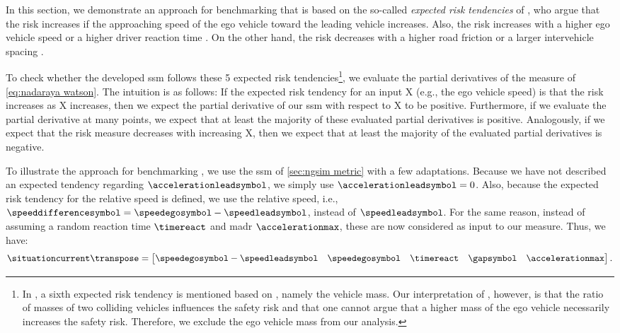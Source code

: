 In this section, we demonstrate an approach for benchmarking  that is based on the so-called \emph{expected risk tendencies} of \textcite{mullakkal2017comparative}, who argue that the risk increases if the approaching speed of the ego vehicle toward the leading vehicle increases.
Also, the risk increases with a higher ego vehicle speed \autocite{aarts2006driving} or a higher driver reaction time \autocite{klauer2006impact}.
On the other hand, the risk decreases with a higher road friction \autocite{wallman2001friction} or a larger intervehicle spacing \autocite{mullakkal2017comparative}.

To check whether the developed \ac{ssm} follows these 5 expected risk tendencies\footnote{In \autocite{mullakkal2017comparative}, a sixth expected risk tendency is mentioned based on \autocite{evans1994driver}, namely the vehicle mass. 
Our interpretation of \autocite{evans1994driver}, however, is that the ratio of masses of two colliding vehicles influences the safety risk and that one cannot argue that a higher mass of the ego vehicle necessarily increases the safety risk. 
Therefore, we exclude the ego vehicle mass from our analysis.}, we evaluate the partial derivatives of the measure of \cref{eq:nadaraya watson}.
The intuition is as follows: If the expected risk tendency for an input X (e.g., the ego vehicle speed) is that the risk increases as X increases, then we expect the partial derivative of our \ac{ssm} with respect to X to be positive.
Furthermore, if we evaluate the partial derivative at many points, we expect that at least the majority of these evaluated partial derivatives is positive.
Analogously, if we expect that the risk measure decreases with increasing X, then we expect that at least the majority of the evaluated partial derivatives is negative.

To illustrate the approach for benchmarking , we use the \ac{ssm} of \cref{sec:ngsim metric} with a few adaptations.
Because we have not described an expected tendency regarding $\accelerationleadsymbol$, we simply use $\accelerationleadsymbol=0$.
\cstarta Also, because the expected risk tendency for the relative speed is defined, we use the relative speed, i.e., $\speeddifferencesymbol=\speedegosymbol-\speedleadsymbol$, instead of $\speedleadsymbol$. 
For the same reason, \cenda instead of assuming a random reaction time $\timereact$ and \ac{madr} $\accelerationmax$, these are now considered as input to our measure. 
Thus, we have:
\begin{equation}
	\label{eq:input partial derivatives}
	\situationcurrent\transpose = \begin{bmatrix}
		\speedegosymbol-\speedleadsymbol & \speedegosymbol & \timereact & \gapsymbol & \accelerationmax
	\end{bmatrix}.
\end{equation}

